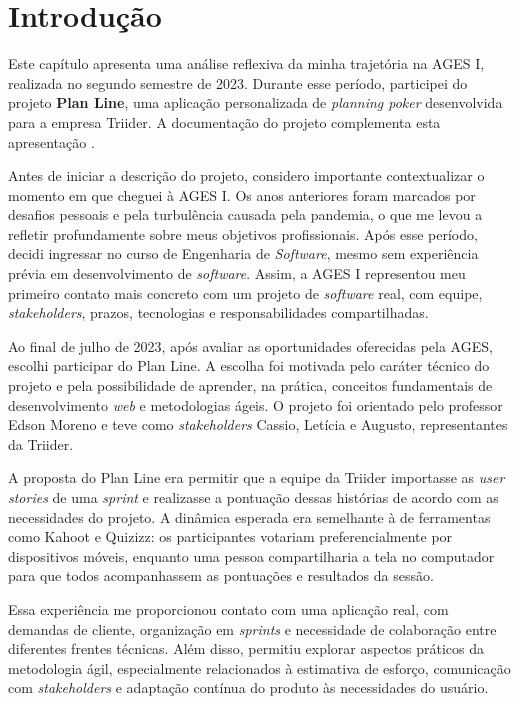 \section[Introdução]{Introdução}

Este capítulo apresenta uma análise reflexiva da minha trajetória na \ac{AGES} I, realizada no segundo semestre de 2023. Durante esse período, participei do projeto \textbf{Plan Line}, uma aplicação personalizada de \textit{planning poker} desenvolvida para a empresa Triider. A documentação do projeto complementa esta apresentação \cite{planline}.

Antes de iniciar a descrição do projeto, considero importante contextualizar o momento em que cheguei à \ac{AGES} I. Os anos anteriores foram marcados por desafios pessoais e pela turbulência causada pela pandemia, o que me levou a refletir profundamente sobre meus objetivos profissionais. Após esse período, decidi ingressar no curso de Engenharia de \textit{Software}, mesmo sem experiência prévia em desenvolvimento de \textit{software}. Assim, a \ac{AGES} I representou meu primeiro contato mais concreto com um projeto de \textit{software} real, com equipe, \textit{stakeholders}, prazos, tecnologias e responsabilidades compartilhadas.

Ao final de julho de 2023, após avaliar as oportunidades oferecidas pela \ac{AGES}, escolhi participar do Plan Line. A escolha foi motivada pelo caráter técnico do projeto e pela possibilidade de aprender, na prática, conceitos fundamentais de desenvolvimento \textit{web} e metodologias ágeis. O projeto foi orientado pelo professor Edson Moreno e teve como \textit{stakeholders} Cassio, Letícia e Augusto, representantes da Triider.

A proposta do Plan Line era permitir que a equipe da Triider importasse as \textit{user stories} de uma \textit{sprint} e realizasse a pontuação dessas histórias de acordo com as necessidades do projeto. A dinâmica esperada era semelhante à de ferramentas como Kahoot e Quizizz: os participantes votariam preferencialmente por dispositivos móveis, enquanto uma pessoa compartilharia a tela no computador para que todos acompanhassem as pontuações e resultados da sessão.

Essa experiência me proporcionou contato com uma aplicação real, com demandas de cliente, organização em \textit{sprints} e necessidade de colaboração entre diferentes frentes técnicas. Além disso, permitiu explorar aspectos práticos da metodologia ágil, especialmente relacionados à estimativa de esforço, comunicação com \textit{stakeholders} e adaptação contínua do produto às necessidades do usuário.

